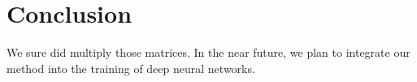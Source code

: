 \documentclass{article}  %
\begin{document}
\section{Conclusion}

We sure did multiply those matrices. In the near future, we plan to integrate our method into the training of deep neural networks.




% 
% 

% 

\end{document}

